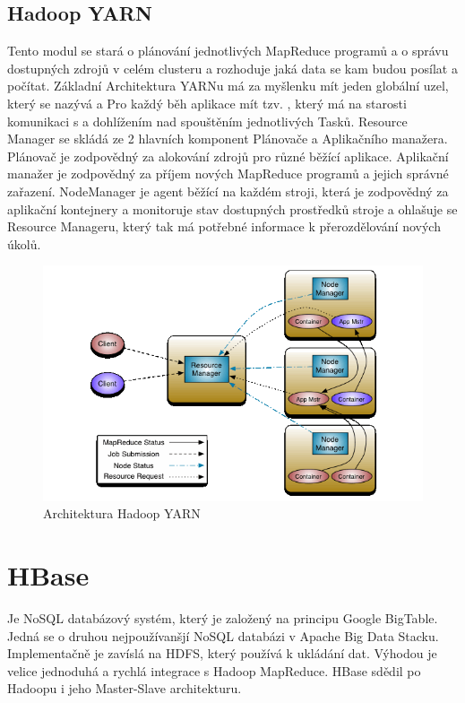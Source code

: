 \documentclass[thesis=M,czech]{FITthesis}[2012/06/26]
\begin{document}
\subsection{Hadoop YARN}
Tento modul se stará o plánování jednotlivých MapReduce programů a o správu dostupných zdrojů v celém clusteru a rozhoduje jaká data se kam budou posílat a počítat. Základní Architektura YARNu má za myšlenku mít jeden globální uzel, který se nazývá  a Pro každý běh aplikace mít tzv. , který má na starosti komunikaci s  a dohlížením nad spouštěním jednotlivých Tasků. Resource Manager se skládá ze 2 hlavních komponent Plánovače a Aplikačního manažera. Plánovač je zodpovědný za alokování zdrojů pro různé běžící aplikace. Aplikační manažer je zodpovědný za příjem nových MapReduce programů a jejich správné zařazení. NodeManager je agent běžící na každém stroji, která je zodpovědný za aplikační kontejnery a monitoruje stav dostupných prostředků stroje a ohlašuje se Resource Manageru, který tak má potřebné informace k přerozdělování nových úkolů.

\begin{figure}[h]
\centering
\includegraphics[scale=0.7]{images/yarn_architecture}
\caption{Architektura Hadoop YARN}
\label{fig:yarn}

\end{figure}



\newpage 

\section{HBase}
Je NoSQL databázový systém, který je založený na principu Google BigTable. Jedná se o druhou nejpoužívanšjí NoSQL databázi v Apache Big Data Stacku. Implementačně je zavíslá na HDFS, který používá k ukládání dat. Výhodou je velice jednoduhá a rychlá integrace s Hadoop MapReduce. HBase sdědil po Hadoopu i jeho Master-Slave architekturu.
\end{document}

